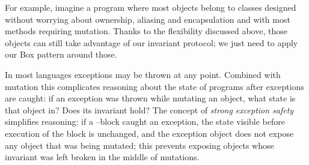 For example, imagine a program where most objects belong to classes designed without worrying about ownership, aliasing and encapsulation and with most methods requiring mutation.
Thanks to the flexibility discussed above, those objects can still take advantage of our invariant protocol; we just need to apply our Box pattern around those.

\label{s:exceptions}
In most languages exceptions may be thrown at any point. Combined with mutation this complicates reasoning about the state of programs after exceptions are caught: if an exception was thrown while mutating an object, what state is that object in? Does its invariant hold?
The concept of \emph{strong exception safety}~\cite{Abrahams2000,JOT:issue_2011_01/article1} simplifies reasoning:
if a \Q@try@--\Q@catch@ block caught an exception, the state visible before execution of the \Q@try@ block is unchanged, and the exception object does not expose any object that was being mutated; this prevents exposing objects whose invariant was left broken in the middle of mutations.

